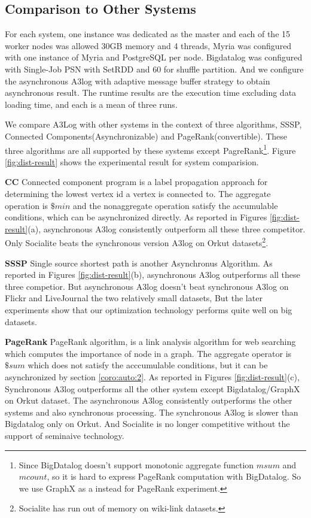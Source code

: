 \subsection{Comparison to Other Systems}




For each system, one instance was dedicated as the master and each of the 15 worker nodes was allowed 30GB memory and 4 threads, Myria was configured with one instance of Myria and PostgreSQL per node. Bigdatalog was configured with Single-Job PSN with SetRDD and 60 for shuffle partition. And we configure the asynchronous A3log with adaptive message buffer strategy to obtain asynchronous result. The runtime results are the execution time excluding data loading time, and each is a mean of three runs.

We compare A3Log with other systems in the context of three algorithms, SSSP, Connected Components(Asynchronizable) and PageRank(convertible). These three algorithms are all supported by these systems except PagreRank\footnote{Since BigDatalog doesn't support monotonic aggregate function $msum$ and $mcount$, so it is hard to express PageRank computation with BigDatalog. So we use GraphX as a instead for PageRank experiment.}. Figure \ref{fig:dist-result} shows the experimental result for system comparision. 

\textbf{CC} Connected component program is a label propagation approach for determining the lowest vertex id a vertex is connected to. The aggregate operation is $\$min$ and the nonaggregate operation satisfy the accumulable conditions, which can be asynchronized directly. As reported in Figures \ref{fig:dist-result}(a), asynchronous A3log consistently outperform all these three competitor. Only Socialite beats the synchronous version A3log on Orkut datasets\footnote{Socialite has run out of memory on wiki-link datasets.}. 

\textbf{SSSP} Single source shortest path is another Asynchronus Algorithm. As reported in Figures \ref{fig:dist-result}(b), asynchronous A3log outperforms all these three competior. But asynchronous A3log doesn't beat synchronous A3log on Flickr and LiveJournal the two relatively small datasets, But the later experiments show that our optimization technology performs quite well on big datasets.

\textbf{PageRank} PageRank algorithm, is a link analysis algorithm for web searching which computes the importance of node in a graph. The aggregate operator is $\$sum$ which does not satisfy the acccumulable conditions, but it can be  asynchronized by section \ref{coro:auto:2}. As reported in Figures \ref{fig:dist-result}(c), Synchronous A3log outperforms all the other system except Bigdatalog/GraphX on Orkut dataset. The asynchronous A3log consistently outperforms the other systems and also synchronous processing. The synchronous A3log is slower than Bigdatalog only on Orkut. And Socialite is no longer competitive without the support of seminaive technology.

